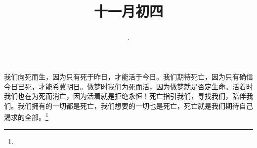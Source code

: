 \title{\date[d=4,m=12,y=2024][year:cn-y,年,month:cn,day:cn,日,·,weekday]·十一月初四 }
我们向死而生，因为只有死于昨日，才能活于今日。我们期待死亡，因为只有确信今日已死，才能希冀明日。做梦时我们为死而活，因为做梦就是否定生命。活着时我们也在为死而消亡，因为活着就是拒绝永恒！死亡指引我们，寻找我们，陪伴我们。我们拥有的一切都是死亡，我们想要的一切也是死亡，死亡就是我们期待自己渴求的全部。\footnote{ }

